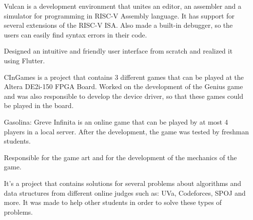 \documentclass[]{deedy-resume-openfont}
\begin{document}
\begin{minipage}[t]{0.66\textwidth}
\begin{tightemize}
\item { Vulcan is a development environment that unites an editor, an assembler and a simulator for programming in RISC-V Assembly language. It has support for several extensions of the RISC-V ISA. Also made a built-in debugger, so the users can easily find syntax errors in their code.}
\item { Designed an intuitive and friendly user interface from scratch and realized it using Flutter.}
\end{tightemize}

\begin{tightemize}
\item {CInGames is a project that contains 3 different games that can be played at the Altera DE2i-150 FPGA Board. Worked on the development of the Genius game and was also responsible to develop the device driver, so that these games could be played in the board. }
\end{tightemize}

\begin{tightemize}
\item {Gasolina: Greve Infinita is an online game that can be played by at most 4 players in a local server. After the development, the game was tested by freshman students.}
\item {Responsible for the game art and for the development of the mechanics of the game.} 
\end{tightemize}

\begin{tightemize}
\item {It's a project that contains solutions for several problems about algorithms and data structures from different online judges such as: UVa, Codeforces, SPOJ and more. It was made to help other students in order to solve these types of problems.}
\end{tightemize}




\end{minipage}
\end{document}
